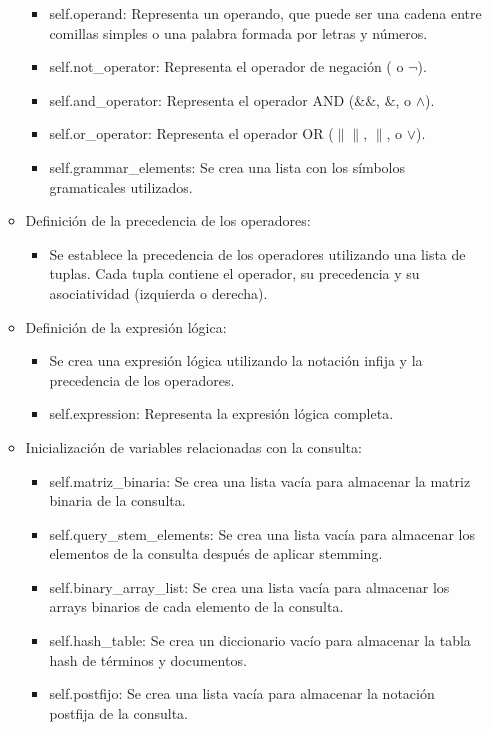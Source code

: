 \begin{itemize}
\begin{itemize}
\begin{itemize}
      \item self.operand: Representa un operando, que puede ser una cadena entre comillas simples o una palabra formada por letras y números.
      \item self.not\_operator: Representa el operador de negación (\! o $\neg$).
      \item self.and\_operator: Representa el operador AND ($\&\&$, $\&$, o $\land$).
      \item self.or\_operator: Representa el operador OR ($\|\|$, $\|$, o $\lor$).
      \item self.grammar\_elements: Se crea una lista con los símbolos gramaticales utilizados. 
    \end{itemize}
    \item Definición de la precedencia de los operadores:
    \begin{itemize}
      \item Se establece la precedencia de los operadores utilizando una lista de tuplas.
      Cada tupla contiene el operador, su precedencia y su asociatividad (izquierda o derecha).
    \end{itemize}
    \item Definición de la expresión lógica:
    \begin{itemize}
      \item Se crea una expresión lógica utilizando la notación infija y la precedencia de los operadores.
      \item self.expression: Representa la expresión lógica completa.
    \end{itemize}
    \item Inicialización de variables relacionadas con la consulta:
    \begin{itemize}
      \item self.matriz\_binaria: Se crea una lista vacía para almacenar la matriz binaria de la consulta.
      \item self.query\_stem\_elements: Se crea una lista vacía para almacenar los elementos de la consulta después de aplicar stemming.
      \item self.binary\_array\_list: Se crea una lista vacía para almacenar los arrays binarios de cada elemento de la consulta.
      \item self.hash\_table: Se crea un diccionario vacío para almacenar la tabla hash de términos y documentos.
      \item self.postfijo: Se crea una lista vacía para almacenar la notación postfija de la consulta.

\end{itemize}
\end{itemize}
\end{itemize}

